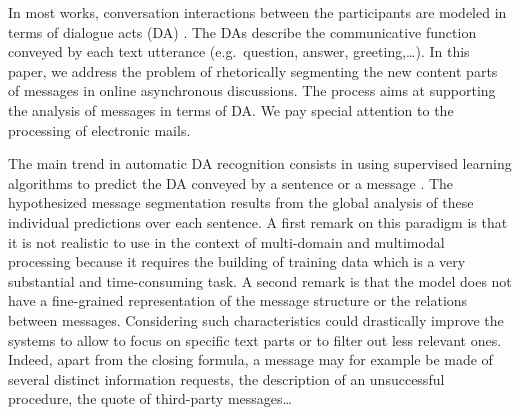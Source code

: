 In most works, conversation interactions between the participants are modeled in terms of dialogue acts (DA) \cite{austin:1970}. The DAs describe the communicative function conveyed by each text utterance  (e.g.~question, answer, greeting,\ldots).
%
In this paper, we address the problem of rhetorically segmenting the new content parts of messages in online asynchronous discussions. 
The process aims at supporting the analysis of messages in terms of DA.
We pay special attention to the processing of electronic mails.

%
The main trend in automatic DA recognition consists in using supervised learning algorithms to predict the DA conveyed by a sentence or a message \cite{joty:2013:sigdial}.
%
The hypothesized message segmentation results from the global analysis of these individual predictions over each sentence.
%
A first remark on this paradigm is that it is not realistic to use in the context of multi-domain and multimodal processing because it requires the building of training data which is a very substantial and time-consuming task.
%
A second remark is that the model does not have a fine-grained representation of the message structure or the relations between messages. Considering such characteristics could drastically improve the systems %
to allow to focus on specific text parts or to filter out less relevant ones. %
Indeed, apart from the closing formula, a message may for example be made of several distinct information requests, the description of an unsuccessful procedure, the quote of third-party messages\ldots

